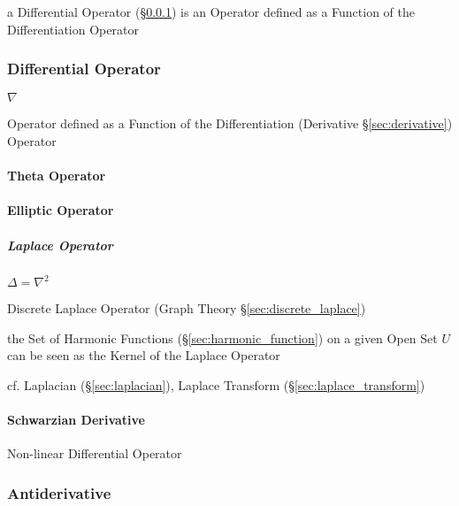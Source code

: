 a Differential Operator (\S\ref{sec:differential_operator}) is an Operator
defined as a Function of the Differentiation Operator



\subsubsection{Differential Operator}\label{sec:differential_operator}


$\nabla$

Operator defined as a Function of the Differentiation (Derivative
\S\ref{sec:derivative}) Operator



\paragraph{Theta Operator}\label{sec:theta_operator}\hfill

\paragraph{Elliptic Operator}\label{sec:elliptic_operator}\hfill

\subparagraph{Laplace Operator}\label{sec:laplace_operator}\hfill

$\Delta = \nabla^2$

Discrete Laplace Operator (Graph Theory \S\ref{sec:discrete_laplace})

the Set of Harmonic Functions (\S\ref{sec:harmonic_function}) on a given Open
Set $U$ can be seen as the Kernel of the Laplace Operator

\fist cf. Laplacian (\S\ref{sec:laplacian}), Laplace Transform
(\S\ref{sec:laplace_transform})



\paragraph{Schwarzian Derivative}\label{sec:schwarzian_derivative}\hfill

Non-linear Differential Operator



\subsubsection{Antiderivative}\label{sec:antiderivative}

